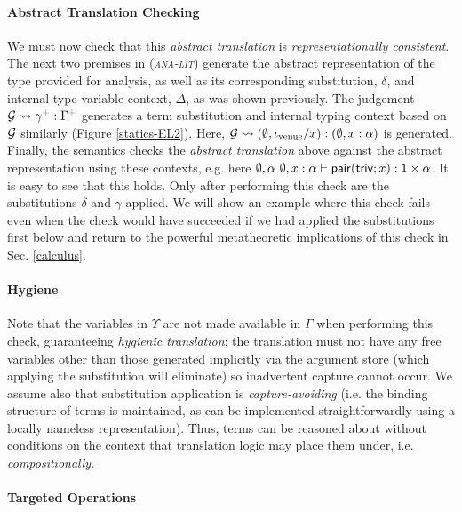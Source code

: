 \documentclass[9pt,preprint]{sigplanconf}
\newcommand{\rulename}[1]{({\textsc{\textsl{#1}}})}
\newcommand{\moutput}{^{\color{gray}{+}}}
\begin{document}
\paragraph{Abstract Translation Checking} We must now check that this \emph{abstract translation} is \emph{representationally consistent}. The next two premises in \rulename{ana-lit} generate the abstract representation of the type provided for analysis, as well as its corresponding substitution, $\delta$, and internal type variable context, $\Delta$, as was shown previously. The judgement $\memG \leadsto \gamma\moutput : \Gamma\moutput$ generates a term substitution and internal typing context based on $\mathcal{G}$ similarly (Figure \ref{statics-EL2}). Here, $\mathcal{G} \leadsto (\emptyset, \iota_\text{venue}/x) : (\emptyset, x : \alpha)$ is generated. Finally, the semantics checks the \emph{abstract translation} above against the abstract representation using these contexts, e.g. here $\emptyset, \alpha~\emptyset, x : \alpha \vdash {\sf pair}({\sf triv}; x) : {\sf 1} \times \alpha$. It is easy to see that this holds. Only after performing this check are the substitutions $\delta$ and $\gamma$ applied. We will  show an example where this check fails even when the check would have succeeded if we had applied the substitutions first below  and return to the powerful metatheoretic implications of this check in Sec. \ref{calculus}.

\paragraph{Hygiene} Note that the variables in $\Upsilon$ are not made available in $\Gamma$ when performing this check, guaranteeing \emph{hygienic translation}: the translation must not have any free variables other than those generated implicitly via the argument store (which applying the  substitution will eliminate) so inadvertent capture cannot occur. We assume also that substitution application is \emph{capture-avoiding} (i.e. the binding structure of terms is maintained, as can be implemented straightforwardly using a locally nameless representation). Thus, terms can be reasoned about without conditions on the context that translation logic may place them under, i.e. \emph{compositionally}.

\paragraph{Targeted Operations} 


\end{document}
